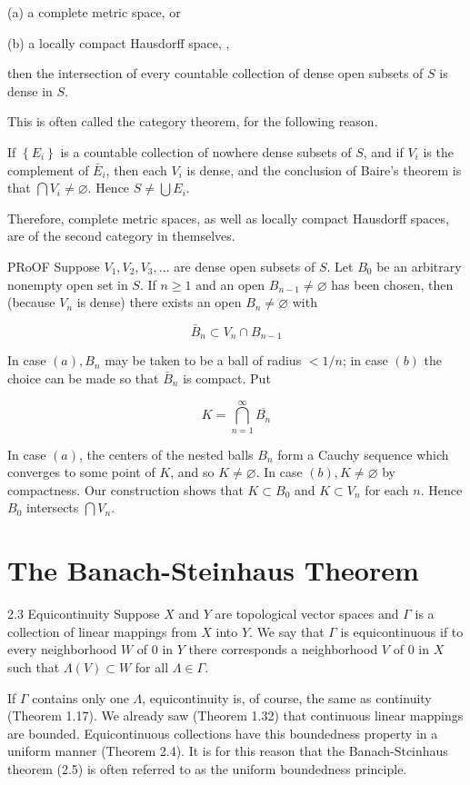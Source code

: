 \documentclass[10pt]{article}
\begin{document}
(a) a complete metric space, or

(b) a locally compact Hausdorff space, ,

then the intersection of every countable collection of dense open subsets of $S$ is dense in $S$.

This is often called the category theorem, for the following reason.

If $\left\{E_{i}\right\}$ is a countable collection of nowhere dense subsets of $S$, and if $V_{i}$ is the complement of $\bar{E}_{i}$, then each $V_{i}$ is dense, and the conclusion of Baire's theorem is that $\bigcap V_{i} \neq \varnothing$. Hence $S \neq \bigcup E_{i}$.

Therefore, complete metric spaces, as well as locally compact Hausdorff spaces, are of the second category in themselves.

PRoOF Suppose $V_{1}, V_{2}, V_{3}, \ldots$ are dense open subsets of $S$. Let $B_{0}$ be an arbitrary nonempty open set in $S$. If $n \geq 1$ and an open $B_{n-1} \neq \varnothing$ has been chosen, then (because $V_{n}$ is dense) there exists an open $B_{n} \neq \varnothing$ with

$$
\bar{B}_{n} \subset V_{n} \cap B_{n-1}
$$

In case $(a), B_{n}$ may be taken to be a ball of radius $<1 / n$; in case $(b)$ the choice can be made so that $\bar{B}_{n}$ is compact. Put

$$
K=\bigcap_{n=1}^{\infty} \overline{B_{n}}
$$

In case $(a)$, the centers of the nested balls $B_{n}$ form a Cauchy sequence which converges to some point of $K$, and so $K \neq \varnothing$. In case $(b), K \neq \varnothing$ by compactness. Our construction shows that $K \subset B_{0}$ and $K \subset V_{n}$ for each $n$. Hence $B_{0}$ intersects $\bigcap V_{n}$.

\section{The Banach-Steinhaus Theorem}
2.3 Equicontinuity Suppose $X$ and $Y$ are topological vector spaces and $\Gamma$ is a collection of linear mappings from $X$ into $Y$. We say that $\Gamma$ is equicontinuous if to every neighborhood $W$ of 0 in $Y$ there corresponds a neighborhood $V$ of 0 in $X$ such that $\Lambda(V) \subset W$ for all $\Lambda \in \Gamma$.

If $\Gamma$ contains only one $\Lambda$, equicontinuity is, of course, the same as continuity (Theorem 1.17). We already saw (Theorem 1.32) that continuous linear mappings are bounded. Equicontinuous collections have this boundedness property in a uniform manner (Theorem 2.4). It is for this reason that the Banach-Stcinhaus theorem (2.5) is often referred to as the uniform boundedness principle.
\end{document}
